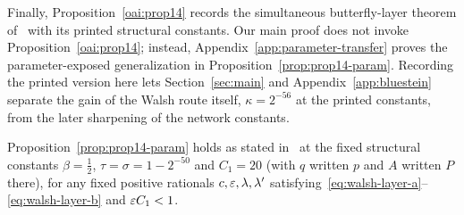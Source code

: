 Finally, Proposition~\ref{oai:prop14} records the simultaneous butterfly-layer theorem of~\cite[Prop.~14]{OAI26} with its printed structural constants. Our main proof does not invoke Proposition~\ref{oai:prop14}; instead, Appendix~\ref{app:parameter-transfer} proves the parameter-exposed generalization in Proposition~\ref{prop:prop14-param}. Recording the printed version here lets Section~\ref{sec:main} and Appendix~\ref{app:bluestein} separate the gain of the Walsh route itself, $\kappa=2^{-56}$ at the printed constants, from the later sharpening of the network constants.

\begin{proposition}\label{oai:prop14}
 Proposition~\ref{prop:prop14-param} holds as stated in~\cite[Prop.~14]{OAI26} at the fixed structural constants
$\beta=\frac12$, $\tau=\sigma=1-2^{-50}$ and $C_1=20$ (with $q$ written $p$ and $A$ written $P$ there), for any fixed
positive rationals $c,\varepsilon,\lambda,\lambda'$ satisfying~\eqref{eq:walsh-layer-a}--\eqref{eq:walsh-layer-b} and
$\varepsilon C_1<1$.
\end{proposition}
